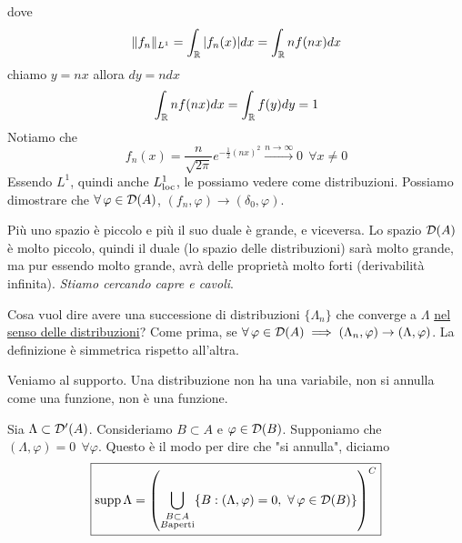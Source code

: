 dove
\begin{equation*}
\Vert f_{n} \Vert_{L^{1}} = \int_{\mathbb{R}}| f_{n}(x)| dx = \int_{\mathbb{R}} nf(nx) dx
\end{equation*}
chiamo $y = nx$ allora $dy = ndx$
\begin{equation*}
\int_{\mathbb{R}} nf(nx) dx = \int_{\mathbb{R}} f(y) dy = 1
\end{equation*}
Notiamo che
\begin{equation*}
f_{n}(x) = \frac{n}{\sqrt{2\pi}} e^{- \frac{1}{2}(nx)^{2}}\xrightarrow{n\rightarrow \infty} 0\ \ \forall x\neq 0
\end{equation*}
Essendo $L^{1}$, quindi anche $L^{1}_{\operatorname{loc}}$, le possiamo vedere come distribuzioni. Possiamo dimostrare che $\forall \varphi \in \Dc(A)$, $(f_{n}, \varphi)\rightarrow (\delta_{0}, \varphi)$.

Più uno spazio è piccolo e più il suo duale è grande, e viceversa. Lo spazio $\mathcal{D}(A)$ è molto piccolo, quindi il duale (lo spazio delle distribuzioni) sarà molto grande, ma pur essendo molto grande, avrà delle proprietà molto forti (derivabilità infinita). \textit{Stiamo cercando capre e cavoli}.

\begin{defn}
Cosa vuol dire avere una successione di distribuzioni $\{\Lambda_{n}\}$ che converge a $\Lambda $ \underline{nel senso delle distribuzioni}? Come prima, se $\forall \varphi \in \Dc(A) \implies (\Lambda_{n}, \varphi)\rightarrow (\Lambda, \varphi)$. La definizione è simmetrica rispetto all'altra.
\end{defn}
Veniamo al supporto. Una distribuzione non ha una variabile, non si annulla come una funzione, non è una funzione.
\begin{defn}
Sia $\Lambda \subset \mathcal{D}'(A)$. Consideriamo $B\subset A$ e $\varphi \in \mathcal{D}(B)$. Supponiamo che $(\Lambda, \varphi) = 0\ \ \forall \varphi $. Questo è il modo per dire che "si annulla", diciamo
\begin{equation*}
\boxed{
\supp \Lambda =
\left(\bigcup_{\substack{B\subset A\\B\text{aperti}}} \{B: (\Lambda, \varphi) = 0, \ \forall \varphi \in \Dc(B)\}\right)^{C}
}
\end{equation*}
\end{defn}

